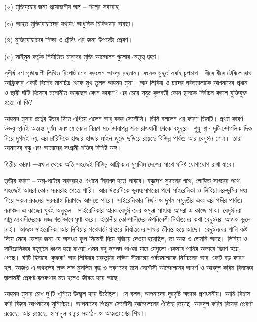 \documentclass[
]{book}
\begin{document}
(২) মুক্তিযুদ্ধের জন্য প্রয়োজনীয় অস্ত্র -- শস্ত্রের সরবরাহ।

(৩) আহত মুক্তিযোদ্ধাদের যথাযথ আধুনিক চিকিৎসার ব্যবস্থা।

(৪) মুক্তিযোদ্ধাদের শিক্ষা ও ট্রেনিং এর জন্য উপদেষ্টা প্রেরণ।

(৫) সাইমুম কর্তৃক নির্যাতিত মানুষের মুক্তি আন্দোলন গুলোর নেতৃত্ব গ্রহণ।

সুদীর্ঘ দশ পৃষ্ঠাব্যাপী লিখিত রিপোর্ট শেষ করলেন আবদুর রহমান। কয়েক মুহূর্ত সবাই চুপচাপ। ধীরে ধীরে টেবিলে রাখা আফ্রিকার একটি বিশেষ মানচিত্র থেকে মুখ তুলল আহমদ মুসা। আর লিবিয়া ও চাদের পর্বতমালাকে আপনাদের প্রধান ও স্থায়ী ঘাঁটি হিসেবে মনোনীত করেছেন কোন কারণে? এর চেয়ে সমুদ্র কুলবর্তী কোন স্থানকে নির্বাচন করলে যুক্তিযুক্ত হতো না কি?

আহমদ মুসার প্রশ্নের উত্তর দিতে এগিয়ে এলেন আবু বকর সেনৌসি। তিনি বললেন এর কারণ তিনটি। প্রথম কারণ উভয় স্থানই অত্যন্ত দুর্গম এবং যে কোন বিরূপ মনোভাবাপন্ন শত্রু রাজধানী থেকে বহুদূরে। শুধু স্থান দুটি ভৌগলিক দিক দিয়ে দুর্গমই নয়, এর চারিদিকে হাজার হাজার মাইল জুড়ে ছড়িয়ে রয়েছে বিভিন্ন পার্বত্য আর বেদুঈন গোত্র। তারা আমাদের বন্ধু এবং আমাদের সংগ্রামী শক্তির বিশিষ্ট অঙ্গ।

দ্বিতীয় কারণ ¬এখান থেকে অতি সহজেই বিভিন্ন আফ্রিকান মুসলিম দেশের সাথে ঘনিষ্ট যোগাযোগ রাখা যাবে।

তৃতীয় কারণ -- অস্ত্র-পাতির সরবরাহও এখানে নিরাপদ হতে পারবে। বন্ধুদেশ সুদানের পথে, লোহিত সাগরের পথে সহজেই আমরা কোন সরবরাহ পেতে পারি। আর উত্তরদিকে ভূমধ্যসাগরের পথে সাইরেনিকা ও লিবিয়া মরুভূমির মধ্য দিয়ে সকল রকমের সরবরাহ নিরাপদে আসতে পারে। সাইরেনিকার নির্জন ও দুর্গম সমুদ্রতীর এবং এর গভীর পার্বত্য বনাঞ্চল এ কাজের খুবই অনুকুল। সাইরেনিকার আরব বেদু্ঈনদের অমূল্য সাহায্য আমরা এ কাজে পাব। বেদুঈনরা সাম্রাজ্যবাদীদেরকে মজ্জাগত ভাবে ঘৃণা করে। ইতালীয় কোম্পানীদের উপনিবেশী নির্যাতনের কথা বেদুঈনরা আজও ভুলে নাই। আজও সাইরেনিকা আর লিবিয়ার পথেঘাটে প্রান্তরে নির্যাতনের সাক্ষর জীবন্ত হয়ে আছে। বেদুঈনদের পানি কষ্ট দিয়ে মেরে ফেলার জন্য যে অসংখ্য কূপ সিমেন্ট দিয়ে বুজিয়ে দেওয়া হয়েছিল, তা আজ ও তেমনি আছে। লিবিয়া ও সাইরেনিকার বহুস্থানে ধ্বংস হয়ে যাওয়া এমন বহু জনপদ পাওয়া যাবে যেগুলো একমাত্র পানির অভাবে বিরাণ হয়ে গেছে। ঘাঁটি হিসাবে `কুফরা' আর লিবিয়ার মরুভূমির দক্ষিণ সীমান্তের পর্বতমালাকে নির্বাচনের আর একটি বড় কারণ হল, আজও এ অঞ্চলের লক্ষ লক্ষ মুসলিম বৃদ্ধ ও তরুণদের মনে সেনৌসী আন্দোলনের আদর্শ ও আবদুল করিম রিনফের জ্বালাময়ী প্রেরণা রূপকথার মত হলেও জীবন্ত হয়ে আছে।

আহমদ মুসার চোখ দু'টি খুশিতে উজ্জ্বল হয়ে উঠেছিল। সে বলল, আপনাদের দূরদৃষ্টি অত্যন্ত প্রশংসনীয়। আমি বিশ্বাস করি বিজয় আপনাদের সুনিশ্চিত। আপনাদের পিছনে সেনৌসী আন্দোলনের ঐতিহ্য রয়েছে, আবদুল করিম রিফের প্রেরণা রয়েছে, আর রয়েছে, হাসানুল বান্নার সংগঠন ও আত্মত্যাগের শিক্ষা।
\end{document}
